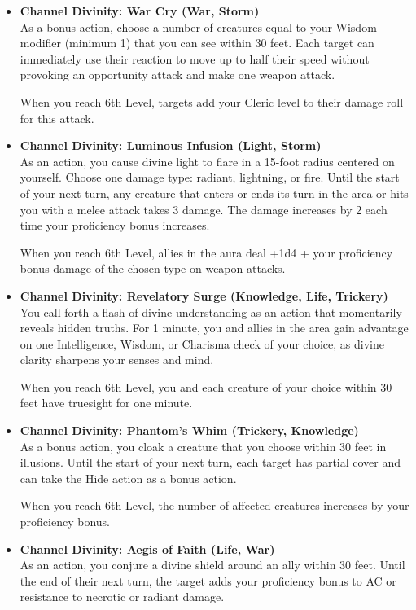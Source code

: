 \begin{itemize}
\item
  \textbf{Channel Divinity: War Cry (War, Storm)}\\
  As a bonus action, choose a number of creatures equal to your Wisdom
  modifier (minimum 1) that you can see within 30 feet. Each target can
  immediately use their reaction to move up to half their speed without
  provoking an opportunity attack and make one weapon attack.

  When you reach 6th Level, targets add your Cleric level to their
  damage roll for this attack.
\item
  \textbf{Channel Divinity: Luminous Infusion (Light, Storm)}\\
  As an action, you cause divine light to flare in a 15-foot radius
  centered on yourself. Choose one damage type: radiant, lightning, or
  fire. Until the start of your next turn, any creature that enters or
  ends its turn in the area or hits you with a melee attack takes 3
  damage. The damage increases by 2 each time your proficiency bonus
  increases.

  When you reach 6th Level, allies in the aura deal +1d4 + your
  proficiency bonus damage of the chosen type on weapon attacks.
\item
  \textbf{Channel Divinity: Revelatory Surge (Knowledge, Life,
  Trickery)}\\
  You call forth a flash of divine understanding as an action that
  momentarily reveals hidden truths. For 1 minute, you and allies in the
  area gain advantage on one Intelligence, Wisdom, or Charisma check of
  your choice, as divine clarity sharpens your senses and mind.

  When you reach 6th Level, you and each creature of your choice within
  30 feet have truesight for one minute.
\item
  \textbf{Channel Divinity: Phantom's Whim (Trickery, Knowledge)}\\
  As a bonus action, you cloak a creature that you choose within 30 feet
  in illusions. Until the start of your next turn, each target has
  partial cover and can take the Hide action as a bonus action.

  When you reach 6th Level, the number of affected creatures increases
  by your proficiency bonus.
\item
  \textbf{Channel Divinity: Aegis of Faith (Life, War)}\\
  As an action, you conjure a divine shield around an ally within 30
  feet. Until the end of their next turn, the target adds your
  proficiency bonus to AC or resistance to necrotic or radiant damage.


\end{itemize}
